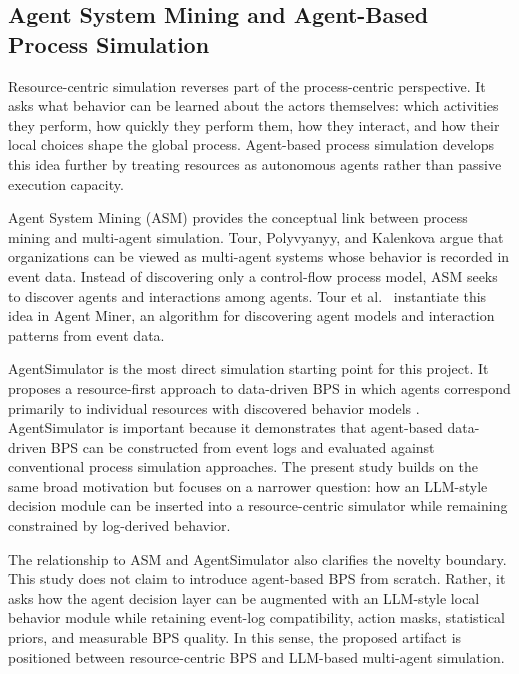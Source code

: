 \subsection{Agent System Mining and Agent-Based Process
Simulation}\label{agent-system-mining-and-agent-based-process-simulation}

Resource-centric simulation reverses part of the process-centric
perspective. It asks what behavior can be learned about the actors
themselves: which activities they perform, how quickly they perform
them, how they interact, and how their local choices shape the global
process. Agent-based process simulation develops this idea further by
treating resources as autonomous agents rather than passive execution
capacity.

Agent System Mining (ASM) provides the conceptual link between process
mining and multi-agent simulation. Tour, Polyvyanyy, and Kalenkova
\cite{tour2021asm} argue that organizations can be viewed as multi-agent systems
whose behavior is recorded in event data. Instead of discovering only a
control-flow process model, ASM seeks to discover agents and
interactions among agents. Tour et al.~\cite{tour2023agentminer} instantiate this idea in
Agent Miner, an algorithm for discovering agent models and interaction
patterns from event data.

AgentSimulator is the most direct simulation starting point for this
project. It proposes a resource-first approach to data-driven BPS in
which agents correspond primarily to individual resources with
discovered behavior models \cite{kirchdorfer2024agentsimulator}. AgentSimulator is
important because it demonstrates that agent-based data-driven BPS can
be constructed from event logs and evaluated against conventional
process simulation approaches. The present study builds on the same
broad motivation but focuses on a narrower question: how an LLM-style
decision module can be inserted into a resource-centric simulator while
remaining constrained by log-derived behavior.

The relationship to ASM and AgentSimulator also clarifies the novelty
boundary. This study does not claim to introduce agent-based BPS from
scratch. Rather, it asks how the agent decision layer can be augmented
with an LLM-style local behavior module while retaining event-log
compatibility, action masks, statistical priors, and measurable BPS
quality. In this sense, the proposed artifact is positioned between
resource-centric BPS and LLM-based multi-agent simulation.

